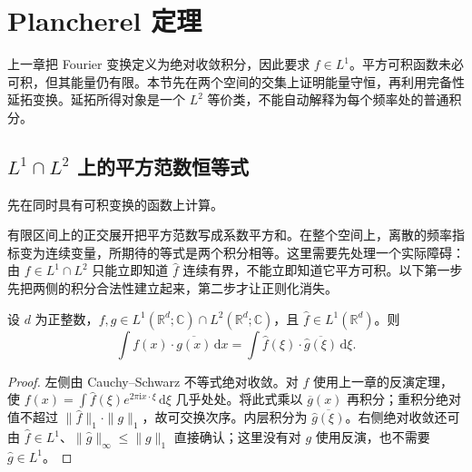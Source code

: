 \section{Plancherel 定理}
\label{b2:sec:0401}

上一章把 Fourier 变换定义为绝对收敛积分，因此要求 \(f\in L^1\)。平方可积函数未必可积，但其能量仍有限。本节先在两个空间的交集上证明能量守恒，再利用完备性延拓变换。延拓所得对象是一个 \(L^2\) 等价类，不能自动解释为每个频率处的普通积分。

\subsection{\texorpdfstring{\(L^1\cap L^2\)}{L¹∩L²} 上的平方范数恒等式}
\label{b2:subsec:040101}

先在同时具有可积变换的函数上计算。

\ProseParagraphBreak

有限区间上的正交展开把平方范数写成系数平方和。在整个空间上，离散的频率指标变为连续变量，所期待的等式是两个积分相等。这里需要先处理一个实际障碍：由 \(f\in L^1\cap L^2\) 只能立即知道 \(\widehat f\) 连续有界，不能立即知道它平方可积。以下第一步先把两侧的积分合法性建立起来，第二步才让正则化消失。

\begin{lemma}\label{b2:lem:04-parseval-core}
设 \(d\) 为正整数，\(f,g\in L^1(\mathbb R^d;\mathbb C)\cap L^2(\mathbb R^d;\mathbb C)\)，且 \(\widehat f\in L^1(\mathbb R^d)\)。则
\[
 \int f(x)\cdot\overline{g(x)}\,\mathrm{d}x
 =\int\widehat f(\xi)\cdot\overline{\widehat g(\xi)}\,\mathrm{d}\xi.
\]
\end{lemma}
\begin{proof}
左侧由 Cauchy--Schwarz 不等式绝对收敛。对 \(f\) 使用上一章的反演定理，使 \(f(x)=\int\widehat f(\xi)e^{2\pi\mathrm{i}x\cdot\xi}\,\mathrm{d}\xi\) 几乎处处。将此式乘以 \(\overline g(x)\) 再积分；重积分绝对值不超过 \(\|\widehat f\|_1\cdot\|g\|_1\)，故可交换次序。内层积分为 \(\overline{\widehat g(\xi)}\)。右侧绝对收敛还可由 \(\widehat f\in L^1\)、\(\|\widehat g\|_\infty\leq\|g\|_1\) 直接确认；这里没有对 \(g\) 使用反演，也不需要 \(\widehat g\in L^1\)。
\end{proof}

